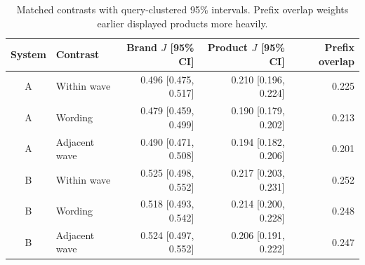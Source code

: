 \begin{table}[H]
\caption{Matched contrasts with query-clustered 95\% intervals. Prefix overlap weights earlier displayed products more heavily.}\label{tab:similarity}
\small
\begin{tabularx}{\textwidth}{c l r r r}
\toprule
System & Contrast & Brand $J$ [95\% CI] & Product $J$ [95\% CI] & Prefix overlap \\
\midrule
A & Within wave & 0.496 [0.475, 0.517] & 0.210 [0.196, 0.224] & 0.225 \\
A & Wording & 0.479 [0.459, 0.499] & 0.190 [0.179, 0.202] & 0.213 \\
A & Adjacent wave & 0.490 [0.471, 0.508] & 0.194 [0.182, 0.206] & 0.201 \\
B & Within wave & 0.525 [0.498, 0.552] & 0.217 [0.203, 0.231] & 0.252 \\
B & Wording & 0.518 [0.493, 0.542] & 0.214 [0.200, 0.228] & 0.248 \\
B & Adjacent wave & 0.524 [0.497, 0.552] & 0.206 [0.191, 0.222] & 0.247 \\
\bottomrule
\end{tabularx}
\end{table}
